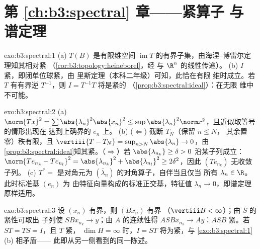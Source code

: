 \section*{第 \ref{ch:b3:spectral} 章——紧算子
与谱定理}

\begin{solution}{exo:b3:spectral:1}
(a) $T(B)$ 是有限维空间
$\operatorname{im}T$ 的有界子集，由海涅–博雷尔定理知其相对紧
（\cref{cor:b3:topology:heineborel}，经
与 $\R^n$ 的线性传递）。
(b) $I$ 紧，即闭单位球紧，由
里斯定理（本科二年级）可知，此恰在有限
维时成立。若 $T$ 有有界逆 $T^{-1}$，则
$I = T^{-1}T$ 将是紧的
（\cref{prop:b3:spectral:ideal}）：在无限
维中不可能。
\end{solution}

\begin{solution}{exo:b3:spectral:2}
(a) $\norm{Tx}^2 = \sum\abs{\lambda_n}^2\abs{x_n}^2 \leq
\sup\abs{\lambda_n}^2\norm x^2$，且近似取等号的情形出现在
达到上确界的 $e_n$ 上。
(b) ($\Leftarrow$) 截断 $T_N$（保留 $n \leq N$，
其余置零）秩有限，且 $\vertiii{T - T_N} =
\sup_{n>N}\abs{\lambda_n} \to 0$，由
\cref{prop:b3:spectral:ideal}知其紧。（$\Rightarrow$）若
$\abs{\lambda_{n_k}} \geq \delta > 0$ 沿某子列成立：
$\norm{Te_{n_k} - Te_{n_l}}^2 = \abs{\lambda_{n_k}}^2 +
\abs{\lambda_{n_l}}^2 \geq 2\delta^2$，因此
$(Te_{n_k})$ 无收敛子列。
(c) $T^* =$ 是对角元为 $(\bar\lambda_n)$ 的对角算子，自伴当且仅当
所有 $\lambda_n \in \R$。此时标准基 $(e_n)$ 为
由特征向量构成的标准正交基，特征值 $\lambda_n \to
0$，即谱定理原样适用。
\end{solution}

\begin{solution}{exo:b3:spectral:3}
设 $(x_n)$ 有界，则 $(Bx_n)$ 有界
（$\vertiii B < \infty$）；由 $S$ 的紧性可取出
子列使 $SBx_{n_k} \to y$；由 $A$ 的连续性得 $ASBx_{n_k} \to
Ay$：$ASB$ 紧。若 $ST = TS = I$，且 $T$ 紧，
$\dim H = \infty$ 时，$I = ST$ 将为紧，与
\cref{exo:b3:spectral:1}(b) 相矛盾——
此即从另一侧看到的同一陈述。
\end{solution}

